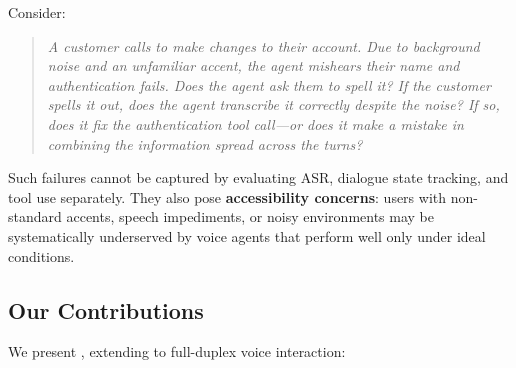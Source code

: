 Consider:

\begin{quote}
\textit{A customer calls to make changes to their account. Due to background noise and an unfamiliar accent, the agent mishears their name and authentication fails. Does the agent ask them to spell it? If the customer spells it out, does the agent transcribe it correctly despite the noise? If so, does it fix the authentication tool call---or does it make a mistake in combining the information spread across the turns?}
\end{quote}

Such failures cannot be captured by evaluating ASR, dialogue state tracking, and tool use separately. They also pose \textbf{accessibility concerns}: users with non-standard accents, speech impediments, or noisy environments may be systematically underserved by voice agents that perform well only under ideal conditions.

\subsection{Our Contributions}

We present \textbf{\tauvoice{}}, extending \tautwobench{} to full-duplex voice interaction:

